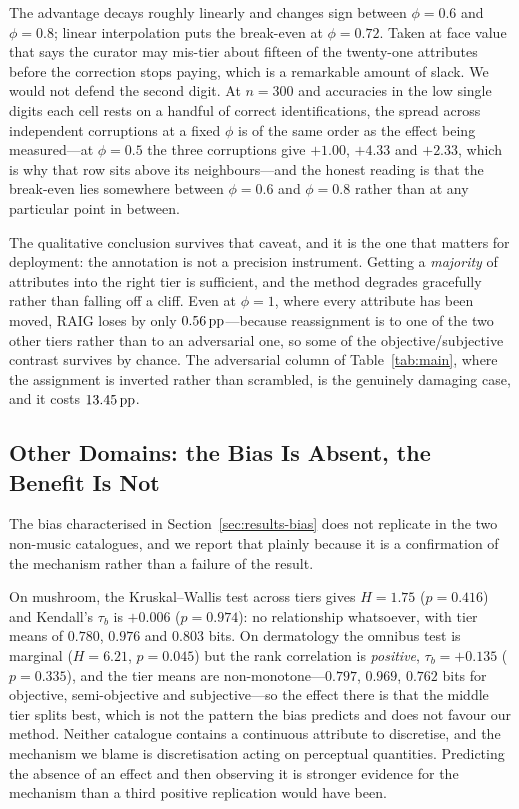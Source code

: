 The advantage decays roughly linearly and changes sign between $\phi = 0.6$ and
$\phi = 0.8$; linear interpolation puts the break-even at $\phi = 0.72$. Taken
at face value that says the curator may mis-tier about fifteen of the
twenty-one attributes before the correction stops paying, which is a
remarkable amount of slack. We would not defend the second digit. At $n = 300$
and accuracies in the low single digits each cell rests on a handful of correct
identifications, the spread across independent corruptions at a fixed $\phi$ is
of the same order as the effect being measured---at $\phi = 0.5$ the three
corruptions give $+1.00$, $+4.33$ and $+2.33$, which is why that row sits above
its neighbours---and the honest reading is that the break-even lies somewhere
between $\phi = 0.6$ and $\phi = 0.8$ rather than at any particular point in
between.

The qualitative conclusion survives that caveat, and it is the one that matters
for deployment: the annotation is not a precision instrument. Getting a
\emph{majority} of attributes into the right tier is sufficient, and the method
degrades gracefully rather than falling off a cliff. Even at $\phi = 1$, where
every attribute has been moved, RAIG loses by only $0.56\,\text{pp}$---because
reassignment is to one of the two other tiers rather than to an adversarial
one, so some of the objective/subjective contrast survives by chance. The
adversarial column of Table~\ref{tab:main}, where the assignment is inverted
rather than scrambled, is the genuinely damaging case, and it costs
$13.45\,\text{pp}$.

\subsection{Other Domains: the Bias Is Absent, the Benefit Is Not}
\label{sec:results-domains}

The bias characterised in Section~\ref{sec:results-bias} does not replicate in
the two non-music catalogues, and we report that plainly because it is a
confirmation of the mechanism rather than a failure of the result.

On mushroom, the Kruskal--Wallis test across tiers gives $H = 1.75$
($p = 0.416$) and Kendall's $\tau_b$ is $+0.006$ ($p = 0.974$): no relationship
whatsoever, with tier means of $0.780$, $0.976$ and $0.803$ bits. On
dermatology the omnibus test is marginal ($H = 6.21$,
$p = 0.045$) but the rank correlation is \emph{positive}, $\tau_b = +0.135$
($p = 0.335$), and the tier means are non-monotone---$0.797$, $0.969$, $0.762$
bits for objective, semi-objective and subjective---so the effect there is that
the middle tier splits best, which is not the pattern the bias predicts and
does not favour our method. Neither catalogue contains a continuous attribute
to discretise, and the mechanism we blame is discretisation acting on
perceptual quantities. Predicting the absence of an effect and then observing
it is stronger evidence for the mechanism than a third positive replication
would have been.

